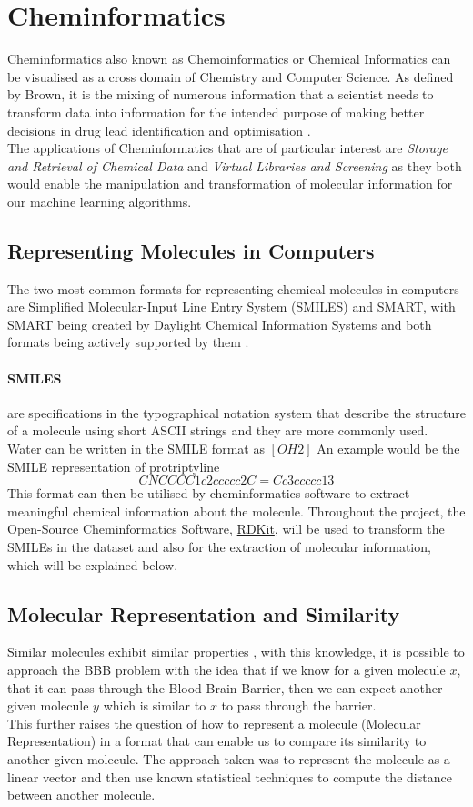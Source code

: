 \documentclass[a4paper,12pt]{report}
\begin{document}
	
	\section{Cheminformatics}
	Cheminformatics also known as Chemoinformatics or Chemical Informatics can be visualised as a cross domain of Chemistry and Computer Science. As defined by Brown, it is the mixing of numerous information that a scientist needs to transform data into information for the intended purpose of making better decisions in drug lead identification and optimisation \cite{FKBrown1998}. \\
	The applications of Cheminformatics that are of particular interest are \textit{Storage and Retrieval of Chemical Data} and \textit{Virtual Libraries and Screening} as they both would enable the manipulation and transformation of molecular information for our machine learning algorithms. 
		\subsection{Representing Molecules in Computers}
		The two most common formats for representing chemical molecules in computers are Simplified Molecular-Input Line Entry System (SMILES) and SMART, with SMART being created by Daylight Chemical Information Systems and both formats being actively supported by them \cite{OpenBabel2017}.
			\paragraph{SMILES} are specifications in the typographical notation system that describe the structure of a molecule using short ASCII strings and they are more commonly used. Water can be written in the SMILE format as $[OH2]$ An example would be the SMILE representation of protriptyline
				\begin{equation*}
					CNCCCC1c2ccccc2C=Cc3ccccc13
				\end{equation*}
			This format can then be utilised by cheminformatics software to extract meaningful chemical information about the molecule. Throughout the project, the Open-Source Cheminformatics Software, \href{www.rdkit.org}{RDKit}, will be used to transform the SMILEs in the dataset and also for the extraction of molecular information, which will be explained below.
		\subsection{Molecular Representation and Similarity}
		Similar molecules exhibit similar properties \cite{JohnMaggiora1990}, with this knowledge, it is possible to approach the BBB problem with the idea that if we know for a given molecule $x$, that it can pass through the Blood Brain Barrier, then we can expect another given molecule $y$ which is similar to $x$ to pass through the barrier. \\
		This further raises the question of how to represent a molecule (Molecular Representation) in a format that can enable us to compare its similarity to another given molecule. The approach taken was to represent the molecule as a linear vector and then use known statistical techniques to compute the distance between another molecule. 
\end{document}
